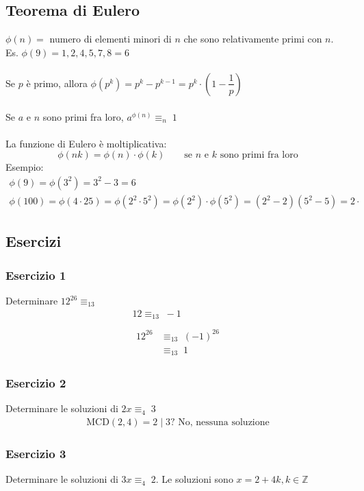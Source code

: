 \documentclass[italian]{article}
\newcommand{\mcd}[2]{\text{$\text{MCD}(#1, #2)$}}
\newcommand{\divides}[2]{\text{$#1 \;|\; #2$}}
\newcommand{\congruente}[1]{\text{$\equiv_{#1}\;$}}
\newcommand{\ins}[1]{\text{$\mathbb{#1}$}}
\begin{document}
\subsection{Teorema di Eulero}
$\phi(n) = $ numero di elementi minori di $n$ che sono relativamente primi con $n$.\\
Es. $\phi(9) = 1,2,4,5,7,8 = 6$\\\\
Se $p$ è primo, allora $\phi(p^k) = p^k - p^{k-1} = p^k \cdot (1 - \dfrac{1}{p})$\\\\
Se $a$ e $n$ sono primi fra loro, $a^{\phi(n)} \congruente{n} 1$\\\\
La funzione di Eulero è moltiplicativa:
\[
	\phi(nk) = \phi(n)\cdot \phi(k) \qquad \text{se $n$ e $k$ sono primi fra loro}
\]
Esempio: 
\begin{gather*}
	\phi(9) = \phi(3^2) = 3^2 - 3 = 6\\
	\phi(100) = \phi(4\cdot25) = \phi(2^2\cdot 5^2) = \phi(2^2)\cdot\phi(5^2) = (2^2-2)(5^2 - 5) = 2 \cdot
\end{gather*}

\newpage
\subsection{Esercizi}
\subsubsection{Esercizio 1}
Determinare $12^{26} \congruente{13}$
\begin{gather*}
	12 \congruente{13} -1 \\\\
	\begin{split}
		12^{26} &\congruente{13} (-1)^{26} \\
		&\congruente{13} 1
	\end{split}
\end{gather*}


\subsubsection{Esercizio 2}
Determinare le soluzioni di $2x \congruente{4} 3$
\begin{gather*}
	\mcd{2}{4} = \divides{2}{3} \text{? No, nessuna soluzione}
\end{gather*}


\subsubsection{Esercizio 3}
Determinare le soluzioni di $3x \congruente{4} 2$. Le soluzioni sono $x=2 + 4k, k\in \ins{Z}$ 
\end{document}
